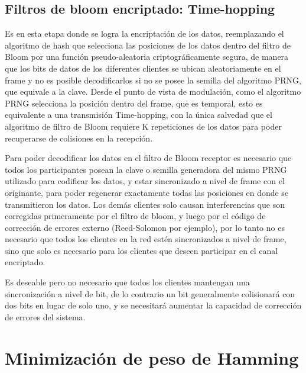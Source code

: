 \subsection{Filtros de bloom encriptado: Time-hopping}

Es en esta etapa donde se logra la encriptación de los datos, reemplazando el algoritmo de hash que selecciona las posiciones de los datos dentro del filtro de Bloom por una función pseudo-aleatoria criptográficamente segura, de manera que los bits de datos de los diferentes clientes se ubican aleatoriamente en el frame y no es posible decodificarlos si no se posee la semilla del algoritmo PRNG, que equivale a la clave. Desde el punto de vista de modulación, como el algoritmo PRNG selecciona la posición dentro del frame, que es temporal, esto es equivalente a una transmisión Time-hopping, con la única salvedad que el algoritmo de filtro de Bloom requiere K repeticiones de los datos para poder recuperarse de colisiones en la recepción.

Para poder decodificar los datos en el filtro de Bloom receptor es necesario que todos los participantes posean la clave o semilla generadora del mismo PRNG utilizado para codificar los datos, y estar sincronizado a nivel de frame con el originante, para poder regenerar exactamente todas las posiciones en donde se transmitieron los datos. Los demás clientes solo causan interferencias que son corregidas primeramente por el filtro de bloom, y luego por el código de corrección de errores externo (Reed-Solomon por ejemplo), por lo tanto no es necesario que todos los clientes en la red estén sincronizados a nivel de frame, sino que solo es necesario para los clientes que deseen participar en el canal encriptado.

Es deseable pero no necesario que todos los clientes mantengan una sincronización a nivel de bit, de lo contrario un bit generalmente colisionará con dos bits en lugar de solo uno, y se necesitará aumentar la capacidad de corrección de errores del sistema.

\section{Minimización de peso de Hamming}

